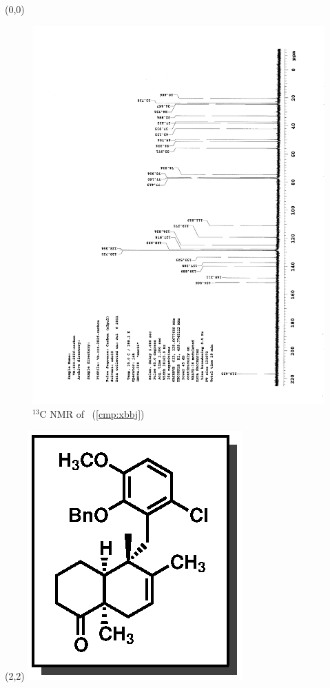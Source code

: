 \clearpage
\begin{textblock}{20}(0,0)
\begin{figure}[htb]
\caption{$^{13}$C NMR of  \CMPxbbj\ (\ref{cmp:xbbj})}
\includegraphics[scale=0.75, trim = 0mm 0mm 0mm 5mm,
clip]{chp_singlecarbon/images/nmr/xbbjC}
\vspace{-100pt}
\end{figure}
\end{textblock}
\begin{textblock}{1}(2,2)
\includegraphics[scale=0.8, angle=90]{chp_singlecarbon/images/xbbj}
\end{textblock}
\clearpage

